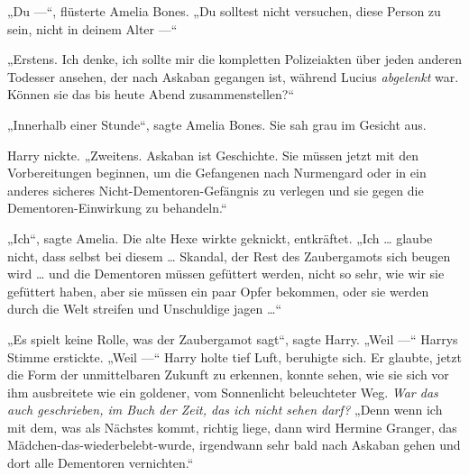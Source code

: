 „Du —“, flüsterte Amelia Bones.
„Du solltest nicht versuchen, diese Person zu sein, nicht in deinem Alter —“

„Erstens. Ich denke, ich sollte mir die kompletten Polizeiakten über jeden anderen Todesser ansehen, der nach Askaban gegangen ist, während Lucius \emph{abgelenkt} war. Können sie das bis heute Abend zusammenstellen?“

„Innerhalb einer Stunde“, sagte Amelia Bones. Sie sah grau im Gesicht aus.

Harry nickte.
„Zweitens. Askaban ist Geschichte. Sie müssen jetzt mit den Vorbereitungen beginnen, um die Gefangenen nach Nurmengard oder in ein anderes sicheres Nicht-Dementoren-Gefängnis zu verlegen und sie gegen die Dementoren-Einwirkung zu behandeln.“

„Ich“, sagte Amelia. Die alte Hexe wirkte geknickt, entkräftet.
„Ich … glaube nicht, dass selbst bei diesem … Skandal, der Rest des Zaubergamots sich beugen wird … und die Dementoren müssen gefüttert werden, nicht so sehr, wie wir sie gefüttert haben, aber sie müssen ein paar Opfer bekommen, oder sie werden durch die Welt streifen und Unschuldige jagen …“

„Es spielt keine Rolle, was der Zaubergamot sagt“, sagte Harry.
„Weil —“
Harrys Stimme erstickte.
„Weil —“
Harry holte tief Luft, beruhigte sich. Er glaubte, jetzt die Form der unmittelbaren Zukunft zu erkennen, konnte sehen, wie sie sich vor ihm ausbreitete wie ein goldener, vom Sonnenlicht beleuchteter Weg.
\emph{War das auch geschrieben, im Buch der Zeit, das ich nicht sehen darf?}
„Denn wenn ich mit dem, was als Nächstes kommt, richtig liege, dann wird Hermine Granger, das Mädchen-das-wiederbelebt-wurde, irgendwann sehr bald nach Askaban gehen und dort alle Dementoren vernichten.“

